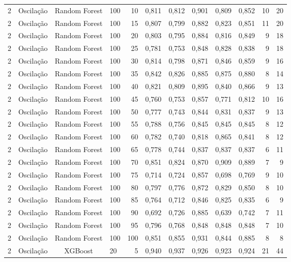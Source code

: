 \begin{longtable}{ccclrrrrrrrr}
2 & Oscilação & Random Forest & 100 & 10 & 0,811 & 0,812 & 0,901 & 0,809 & 0,852 & 10 & 20 \\
2 & Oscilação & Random Forest & 100 & 15 & 0,807 & 0,799 & 0,882 & 0,823 & 0,851 & 11 & 20 \\
2 & Oscilação & Random Forest & 100 & 20 & 0,803 & 0,795 & 0,884 & 0,816 & 0,849 & 9 & 18 \\
2 & Oscilação & Random Forest & 100 & 25 & 0,781 & 0,753 & 0,848 & 0,828 & 0,838 & 9 & 18 \\
2 & Oscilação & Random Forest & 100 & 30 & 0,814 & 0,798 & 0,871 & 0,846 & 0,859 & 9 & 16 \\
2 & Oscilação & Random Forest & 100 & 35 & 0,842 & 0,826 & 0,885 & 0,875 & 0,880 & 8 & 14 \\
2 & Oscilação & Random Forest & 100 & 40 & 0,821 & 0,809 & 0,895 & 0,840 & 0,866 & 9 & 13 \\
2 & Oscilação & Random Forest & 100 & 45 & 0,760 & 0,753 & 0,857 & 0,771 & 0,812 & 10 & 16 \\
2 & Oscilação & Random Forest & 100 & 50 & 0,777 & 0,743 & 0,844 & 0,831 & 0,837 & 9 & 13 \\
2 & Oscilação & Random Forest & 100 & 55 & 0,788 & 0,756 & 0,845 & 0,845 & 0,845 & 8 & 12 \\
2 & Oscilação & Random Forest & 100 & 60 & 0,782 & 0,740 & 0,818 & 0,865 & 0,841 & 8 & 12 \\
2 & Oscilação & Random Forest & 100 & 65 & 0,778 & 0,744 & 0,837 & 0,837 & 0,837 & 6 & 11 \\
2 & Oscilação & Random Forest & 100 & 70 & 0,851 & 0,824 & 0,870 & 0,909 & 0,889 & 7 & 9 \\
2 & Oscilação & Random Forest & 100 & 75 & 0,714 & 0,724 & 0,857 & 0,698 & 0,769 & 9 & 10 \\
2 & Oscilação & Random Forest & 100 & 80 & 0,797 & 0,776 & 0,872 & 0,829 & 0,850 & 8 & 10 \\
2 & Oscilação & Random Forest & 100 & 85 & 0,764 & 0,712 & 0,846 & 0,825 & 0,835 & 6 & 9 \\
2 & Oscilação & Random Forest & 100 & 90 & 0,692 & 0,726 & 0,885 & 0,639 & 0,742 & 7 & 11 \\
2 & Oscilação & Random Forest & 100 & 95 & 0,796 & 0,768 & 0,848 & 0,848 & 0,848 & 7 & 10 \\
2 & Oscilação & Random Forest & 100 & 100 & 0,851 & 0,855 & 0,931 & 0,844 & 0,885 & 8 & 8 \\
2 & Oscilação & XGBoost & 20 & 5 & 0,940 & 0,937 & 0,926 & 0,923 & 0,924 & 21 & 44 \\

\end{longtable}
